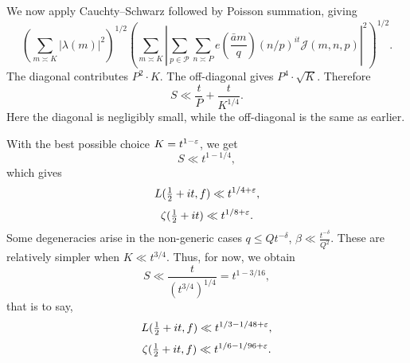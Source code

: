 \documentclass[reqno]{amsart} 
\begin{document}
We now apply Cauchty--Schwarz followed by Poisson summation, giving
\begin{equation*}
  \left( \sum_{m \asymp K}
    \left| \lambda(m) \right|^2\right)^{1/2}
  \left( \sum_{m \asymp K}
    \left| \sum_{p \in \mathcal{P}} \sum_{n \asymp P}
      e \left( \frac{\bar{a} m}{q} \right)
      (n/p)^{i t}
      \mathcal{J}(m, n, p)\right|^2\right)^{1/2}.
\end{equation*}
The diagonal contributes $P^2 \cdot K$.  The off-diagonal gives $P^4 \cdot \sqrt{K}$.  Therefore
\begin{equation*}
  S \ll \frac{t}{P} + \frac{t}{ K^{1/4}}.
\end{equation*}
Here the diagonal is negligibly small, while the off-diagonal is the same as earlier.

With the best possible choice $K = t^{1 - \varepsilon}$, we get
\begin{equation*}
  S \ll t^{1 - 1/4},
\end{equation*}
which gives
\begin{equation*}
  L(\tfrac{1}{2} + i t, f) \ll t^{1/4 + \varepsilon},
\end{equation*}
\begin{equation*}
  \zeta(\tfrac{1}{2} + i t) \ll t^{1/8 + \varepsilon}.
\end{equation*}
Some degeneracies arise in the non-generic cases $q \leq Q t^{- \delta}$, $\beta \ll \frac{t^{- \delta}}{Q^2}$.  These are relatively simpler when $K \ll t^{3/4}$.  Thus, for now, we obtain
\begin{equation*}
  S \ll \frac{t}{(t^{3/4})^{1/4}} = t^{1 - 3/16},
\end{equation*}
that is to say,
\begin{equation*}
  L(\tfrac{1}{2} + i t, f)
  \ll t^{1/3 - 1/48 + \varepsilon},
\end{equation*}
\begin{equation*}
  \zeta(\tfrac{1}{2} + i t, f)
  \ll t^{1/6 - 1/96 + \varepsilon}.
\end{equation*}


{} 
\end{document}
